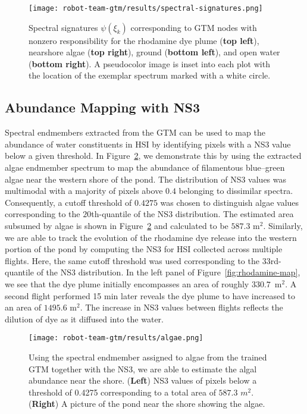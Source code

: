 \clearpage
\newpage

\begin{figure}[H]
  \centering
  \texttt{[image: robot-team-gtm/results/spectral-signatures.png]}
  \caption{Spectral signatures $\psi(\xi_k)$ corresponding to GTM nodes with
    nonzero responsibility for the rhodamine dye plume (\textbf{top left}),
    nearshore algae (\textbf{top right}), ground (\textbf{bottom left}), and
    open water (\textbf{bottom right}). A pseudocolor image is inset into each
    plot with the location of the exemplar spectrum marked with a white
    circle.}
  \label{fig:spectral-signatures}
\end{figure}

\clearpage
\newpage

\subsection{Abundance Mapping with NS3}


Spectral endmembers extracted from the GTM can be used to map the abundance of
water constituents in HSI by identifying pixels with a NS3 value below a given
threshold. In Figure~\ref{fig:algae-map}, we demonstrate this by using the
extracted algae endmember spectrum to map the abundance of filamentous
blue--green algae near the western shore of the pond. The distribution of NS3
values was multimodal with a majority of pixels above $0.4$ belonging to
dissimilar spectra. Consequently, a cutoff threshold of $0.4275$ was chosen to
distinguish algae values corresponding to the $20$th-quantile of the NS3
distribution. The estimated area subsumed by algae is shown in
Figure~\ref{fig:algae-map} and calculated to be $587.3$ m$^2$. Similarly, we are
able to track the evolution of the rhodamine dye release into the western
portion of the pond by computing the NS3 for HSI collected across multiple
flights. Here, the same cutoff threshold was used corresponding to the
$33$rd-quantile of the NS3 distribution. In the left panel of
Figure~\ref{fig:rhodamine-map}, we see that the dye plume initially encompasses
an area of roughly $330.7$~m$^2$. A second flight performed 15 min later reveals
the dye plume to have increased to an area of $1495.6$ m$^2$. The increase in
NS3 values between flights reflects the dilution of dye as it diffused into the
water.

\clearpage
\newpage

\begin{figure}[H]
  \centering
  \texttt{[image: robot-team-gtm/results/algae.png]}
  \caption{Using the spectral endmember assigned to algae from the trained GTM
    together with the NS3, we are able to estimate the algal abundance near the
    shore. (\textbf{Left}) NS3 values of pixels below a threshold of 0.4275
    corresponding to a total area of $587.3$ $m^2$. (\textbf{Right}) A picture
    of the pond near the shore showing the algae.}
  \label{fig:algae-map}
\end{figure}


